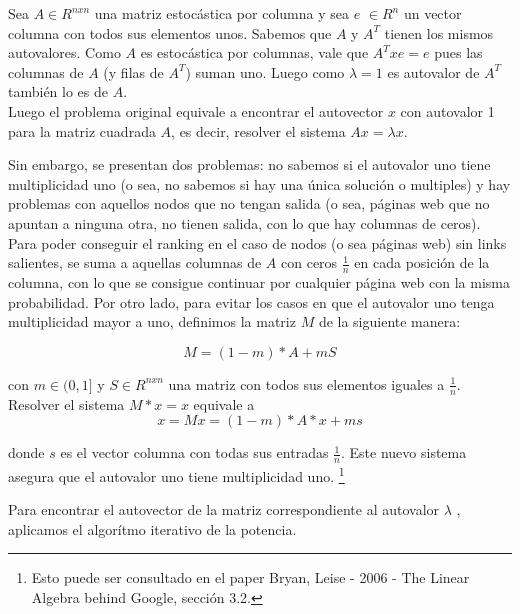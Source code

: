 Sea $A \in R^{nxn}$ una matriz estocástica por columna y sea $e$ $\in R^{n}$ un vector columna con todos sus elementos unos. Sabemos que $A$ y $A^{T}$ tienen los mismos autovalores.
Como $A$ es estocástica por columnas, vale que $A^{T} x e = e$ pues las columnas de $A$ (y filas de $A^{T}$) suman uno. Luego como $\lambda = 1$ es autovalor de $A^{T}$ también lo es de $A$. \\


Luego el problema original equivale a encontrar el autovector $x$ con autovalor 1 para la matriz cuadrada $A$, es decir, resolver el sistema $Ax = \lambda x$.

Sin embargo, se presentan dos problemas: no sabemos si el autovalor uno tiene multiplicidad uno (o sea, no sabemos si hay una única solución o multiples) y hay problemas con aquellos nodos que no tengan salida (o sea, páginas web que no apuntan a ninguna otra, no tienen salida, con lo que hay columnas de ceros).\\


Para poder conseguir el ranking en el caso de nodos (o sea páginas web) sin links salientes, se suma a aquellas columnas de $A$ con ceros $\frac{1}{n}$ en cada posición de la columna, con lo que se consigue continuar por cualquier página web con la misma probabilidad.
Por otro lado, para evitar los casos en que el autovalor uno tenga multiplicidad mayor a uno, definimos la matriz $M$ de la siguiente manera:

  $$M = (1-m)* A + mS$$

\noindent con $m \in (0,1]$ y $S \in R^{nxn}$ una matriz con todos sus elementos iguales a $\frac{1}{n}$.\\
Resolver el sistema $M * x = x$ equivale a 
$$x = M x = (1-m)*A * x+ ms $$

\noindent donde $s$ es el vector columna con todas sus entradas $\frac{1}{n}$. Este nuevo sistema asegura que el autovalor uno tiene multiplicidad uno. \footnote{Esto puede ser consultado en el paper Bryan, Leise - 2006 - The Linear Algebra behind Google, sección 3.2.}


Para encontrar el autovector de la matriz correspondiente al autovalor $\lambda$ , aplicamos el algorítmo iterativo de la potencia.\\



